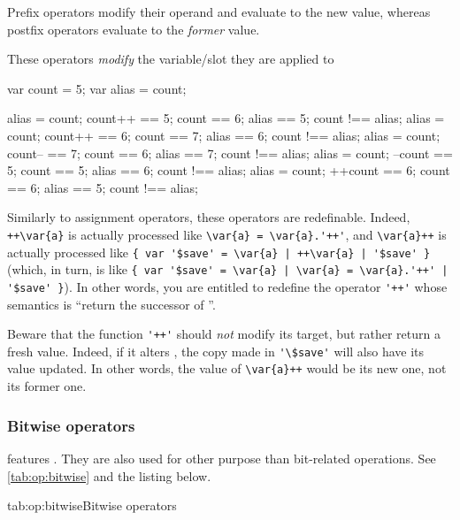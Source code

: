 Prefix operators modify their operand and evaluate to the new value, whereas
postfix operators evaluate to the \emph{former} value.

These operators \emph{modify} the variable/slot they are applied to

\begin{urbiassert}
var count = 5;
var alias = count;

alias = count; count++ == 5; count == 6; alias == 5; count !== alias;
alias = count; count++ == 6; count == 7; alias == 6; count !== alias;
alias = count; count-- == 7; count == 6; alias == 7; count !== alias;
alias = count; --count == 5; count == 5; alias == 6; count !== alias;
alias = count; ++count == 6; count == 6; alias == 5; count !== alias;
\end{urbiassert}

Similarly to assignment operators, these operators are redefinable.  Indeed,
\lstinline|++\var{a}| is actually processed like
\lstinline-\var{a} = \var{a}.'++'-, and \lstinline|\var{a}++| is actually
processed like \lstinline-{ var '$save' = \var{a} | ++\var{a} | '$save' }-
(which, in turn, is like
\lstinline-{ var '$save' = \var{a} | \var{a} = \var{a}.'++' | '$save' }-).
In other words, you are entitled to redefine the operator \lstinline|'++'|
whose semantics is ``return the successor of \this''.

Beware that the function \lstinline|'++'| should \emph{not} modify its
target, but rather return a fresh value.  Indeed, if it alters \this, the
copy made in \lstinline|'\$save'| will also have its value updated.  In other
words, the value of \lstinline|\var{a}++| would be its new one, not its
former one.


\subsubsection{Bitwise operators}
\label{sec:lang:op:bitwise}

\us features .  They are also used for other
purpose than bit-related operations. See \autoref{tab:op:bitwise} and the
listing below.

\begin{operatorTable}{tab:op:bitwise}{Bitwise operators}
  \operatorbcompl
  \\\hline
  \operatorlshift\\\operatorrshift
  \\\hline
  \operatorband
  \\\hline
  \operatorbxor
  \\\hline
  \operatorbor
\end{operatorTable}

